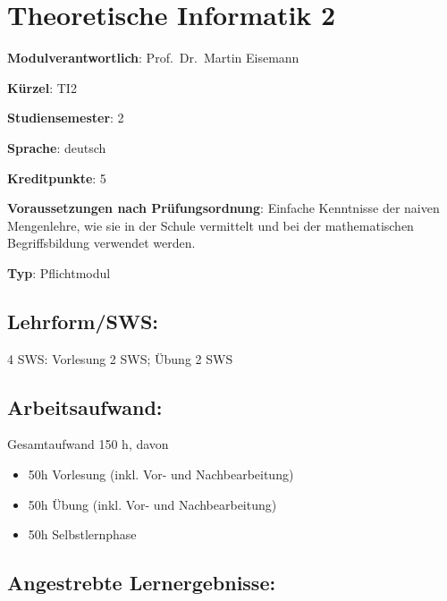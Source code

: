 \chapter{Theoretische Informatik 2}\label{theoretische-informatik-2}

\begin{modulHead}
\textbf{Modulverantwortlich}: Prof.~Dr.~Martin
Eisemann
\end{modulHead}
\begin{modulHead}
\textbf{Kürzel}:
TI2
\end{modulHead}
\begin{modulHead}
\textbf{Studiensemester}:
2
\end{modulHead}
\begin{modulHead}
\textbf{Sprache}:
deutsch
\end{modulHead}
\begin{modulHead}
\textbf{Kreditpunkte}:
5
\end{modulHead}
\begin{modulHead}
\textbf{Voraussetzungen nach
Prüfungsordnung}: Einfache Kenntnisse der naiven Mengenlehre, wie sie in
der Schule vermittelt und bei der mathematischen Begriffsbildung
verwendet werden.
\end{modulHead}
\begin{modulHead}
\textbf{Typ}:
Pflichtmodul
\end{modulHead}


\section*{Lehrform/SWS:}\label{lehrformsws-24}

4 SWS: Vorlesung 2 SWS; Übung 2 SWS

\section*{Arbeitsaufwand:}\label{arbeitsaufwand-23}

Gesamtaufwand 150 h, davon

\begin{itemize}
\tightlist
\item
  50h Vorlesung (inkl. Vor- und Nachbearbeitung)
\item
  50h Übung (inkl. Vor- und Nachbearbeitung)
\item
  50h Selbstlernphase
\end{itemize}

\section*{Angestrebte
Lernergebnisse:}\label{angestrebte-lernergebnisse-24}

